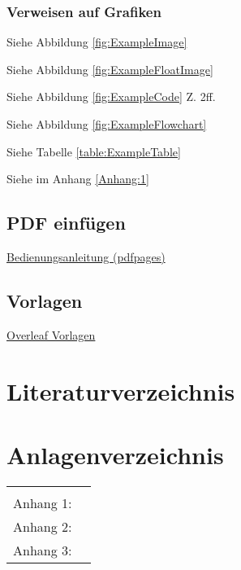 \documentclass[a4paper, 11pt]{article}
\begin{document}
\subsubsection{Verweisen auf Grafiken}

Siehe Abbildung \ref{fig:ExampleImage}

Siehe Abbildung \ref{fig:ExampleFloatImage}

Siehe Abbildung \ref{fig:ExampleCode} Z. 2ff.

Siehe Abbildung \ref{fig:ExampleFlowchart}

Siehe Tabelle \ref{table:ExampleTable}

Siehe im Anhang \ref{Anhang:1}
\newpage

\subsection{PDF einfügen}

\href{https://texdoc.org/serve/pdfpages.pdf/0}{Bedienungsanleitung (pdfpages)}
%
\newpage

\subsection{Vorlagen}

\href{https://de.overleaf.com/latex/templates}{Overleaf Vorlagen}

\newpage


\setcounter{page}{\value{savepage}}

\section*{Literaturverzeichnis}
\renewcommand\refname{}
\printbibliography
\newpage

\section*{Anlagenverzeichnis}
\captionsetup[figure]{list=no}
\setcounter{figure}{0}
\renewcommand{\figurename}{Anhang}
\renewcommand{\thefigure}{\arabic{figure}}

\renewcommand\tabularxcolumn[1]{b{#1}}
\renewcommand*{\arraystretch}{1.5}
\begin{tabularx}{\textwidth}{Xr}
\multicolumn{2}{c}{}\\
Anhang 1: \nameref{Anhang:1} \dotfill&\pageref{Anhang:1}\\
Anhang 2: \nameref{Anhang:2} \dotfill&\pageref{Anhang:2}\\
Anhang 3: \nameref{Anhang:3} \dotfill&\pageref{Anhang:3}\\
\end{tabularx}
\newpage
\end{document}
